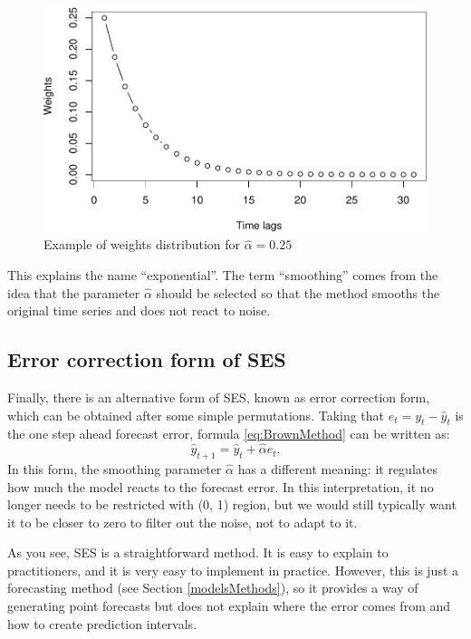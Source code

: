 \documentclass[
]{book}
\theoremstyle{definition}
\theoremstyle{definition}
\theoremstyle{definition}
\theoremstyle{definition}
\theoremstyle{remark}
\begin{document}
\begin{figure}
\centering
\includegraphics{Svetunkov--2022----ADAM_files/figure-latex/BrownExponentialExample-1.pdf}
\caption{\label{fig:BrownExponentialExample}Example of weights distribution for \(\hat{\alpha}=0.25\)}
\end{figure}

This explains the name ``exponential''. The term ``smoothing'' comes from the idea that the parameter \(\hat{\alpha}\) should be selected so that the method smooths the original time series and does not react to noise.

\hypertarget{SESEC}{%
\subsection{Error correction form of SES}\label{SESEC}}

Finally, there is an alternative form of SES, known as error correction form, which can be obtained after some simple permutations. Taking that \(e_t=y_t-\hat{y}_t\) is the one step ahead forecast error, formula \eqref{eq:BrownMethod} can be written as:
\begin{equation}
  \hat{y}_{t+1} = \hat{y}_{t} + \hat{\alpha} e_{t}.
  \label{eq:SESErrorCorrection}
\end{equation}
In this form, the smoothing parameter \(\hat{\alpha}\) has a different meaning: it regulates how much the model reacts to the forecast error. In this interpretation, it no longer needs to be restricted with (0, 1) region, but we would still typically want it to be closer to zero to filter out the noise, not to adapt to it.

As you see, SES is a straightforward method. It is easy to explain to practitioners, and it is very easy to implement in practice. However, this is just a forecasting method (see Section \ref{modelsMethods}), so it provides a way of generating point forecasts but does not explain where the error comes from and how to create prediction intervals.
\end{document}
